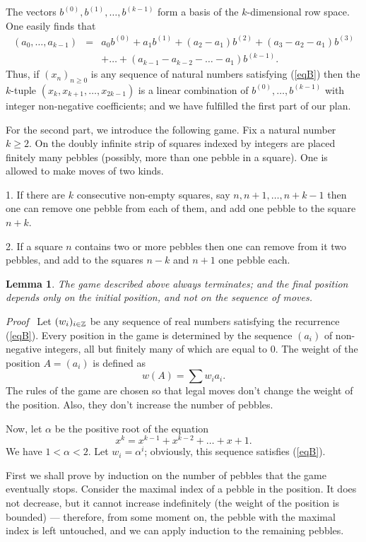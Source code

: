 \documentclass[12pt]{article}
\newtheorem{lemma}[theorem]{Lemma}
\newcommand{\head}[1]{\medbreak\noindent\textit{#1}\ }
\begin{document}
The vectors $b^{(0)},b^{(1)},\ldots,b^{(k-1)}$ form a basis of the 
$k$-dimensional row space. One easily finds that
\begin{eqnarray*}
(a_0,\ldots,a_{k-1})&=&a_0b^{(0)}+a_1b^{(1)}+(a_2-a_1)b^{(2)}+
(a_3-a_2-a_1)b^{(3)}\\&&+\ldots+(a_{k-1}-a_{k-2}-\ldots-a_1)b^{(k-1)}.
\end{eqnarray*}
Thus, if $(x_n)_{n\geq 0}$ is any sequence of natural numbers satisfying
(\ref{eqB}) then the $k$-tuple $(x_k,x_{k+1},\ldots,x_{2k-1})$ is a linear
combination of $b^{(0)},\ldots,b^{(k-1)}$ with integer non-negative
coefficients; and we have fulfilled the first part of our plan.

\medskip
For the second part, we introduce the following game. Fix a natural number 
$k\geq 2$.
On the doubly infinite strip of squares indexed by integers 
are placed finitely many pebbles (possibly, more than one pebble in a square).
One is allowed to make moves of two kinds.

1. If there are $k$ consecutive non-empty squares, say $n,n+1,\ldots,n+k-1$
then one can remove one pebble from each of them, and add one pebble to the 
square $n+k$.

2. If a square $n$ contains two or more  pebbles then one can remove from 
it two pebbles, and add to the squares $n-k$ and $n+1$ one pebble each. 

\begin{lemma}\label{pebblem}
The game described above always terminates; and the final position 
depends only on the initial position, and not on the sequence of moves.
\end{lemma}

\head{Proof}
Let $(w_i)_{i\in\mathbb{Z}}$ be any sequence of real numbers satisfying the recurrence
(\ref{eqB}). Every position in the game is determined by the sequence
$(a_i)$ of non-negative integers, all but finitely many of which are 
equal to 0. The weight of the position $A=(a_i)$ is defined as 
$$w(A)=\sum w_ia_i.$$
The rules of the game are chosen so that legal moves don't change the weight 
of the position. Also, they don't increase the number of pebbles.

Now, let $\alpha$ be the positive root of the equation
$$x^k=x^{k-1}+x^{k-2}+\ldots+x+1.$$
We have $1<\alpha<2$. Let $w_i=\alpha^i$; obviously, this sequence 
satisfies (\ref{eqB}). 

First we shall prove by induction on the number of pebbles that the game 
eventually stops. Consider the maximal index of a pebble in the position.
It does not decrease, but it cannot increase indefinitely (the weight 
of the position is bounded) --- therefore, from some moment on, the pebble
with the maximal index is left untouched, and we can apply induction to the 
remaining pebbles.
\end{document}
